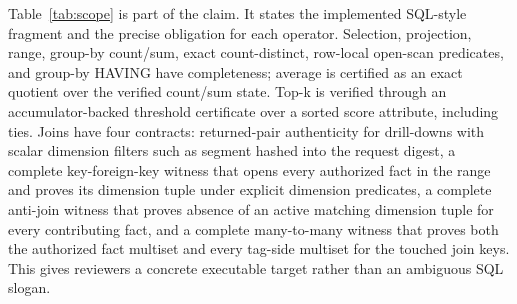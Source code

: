 \documentclass[conference]{IEEEtran}
\begin{document}
Table~\ref{tab:scope} is part of the claim. It states the implemented SQL-style fragment and the precise obligation for each operator. Selection, projection, range, group-by count/sum, exact count-distinct, row-local open-scan predicates, and group-by HAVING have completeness; average is certified as an exact quotient over the verified count/sum state. Top-k is verified through an accumulator-backed threshold certificate over a sorted score attribute, including ties. Joins have four contracts: returned-pair authenticity for drill-downs with scalar dimension filters such as segment hashed into the request digest, a complete key-foreign-key witness that opens every authorized fact in the range and proves its dimension tuple under explicit dimension predicates, a complete anti-join witness that proves absence of an active matching dimension tuple for every contributing fact, and a complete many-to-many witness that proves both the authorized fact multiset and every tag-side multiset for the touched join keys. This gives reviewers a concrete executable target rather than an ambiguous SQL slogan.
\end{document}

